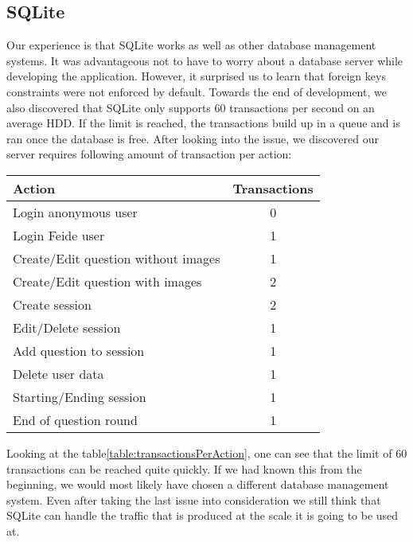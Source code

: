 \subsection{SQLite}
Our experience is that SQLite works as well as other database management systems. It was advantageous not to have to worry about a database server while developing the application. However, it surprised us to learn that foreign keys constraints were not enforced by default. Towards the end of development, we also discovered that SQLite only supports 60 transactions per second on an average HDD. If the limit is reached, the transactions build up in a queue and is ran once the database is free. After looking into the issue, we discovered our server requires following amount of transaction per action:
\begin{center}
    \begin{tabular}{|l|c|}
        \hline
        Action & Transactions \\
        \hline
        Login anonymous user & 0 \\
        \hline
        Login Feide user & 1 \\
        \hline
        Create/Edit question without images & 1 \\
        \hline
        Create/Edit question with images & 2 \\
        \hline
        Create session & 2 \\
        \hline
        Edit/Delete session & 1 \\
        \hline
        Add question to session & 1 \\
        \hline
        Delete user data & 1 \\
        \hline
        Starting/Ending session & 1 \\
        \hline
        End of question round & 1 \\
        \hline
    \end{tabular}
    \label{table:transactionsPerAction}
\end{center}
\noindent
Looking at the table\ref{table:transactionsPerAction}, one can see that the limit of 60 transactions can be reached quite quickly. If we had known this from the beginning, we would most likely have chosen a different database management system. Even after taking the last issue into consideration we still think that SQLite can handle the traffic that is produced at the scale it is going to be used at. 
